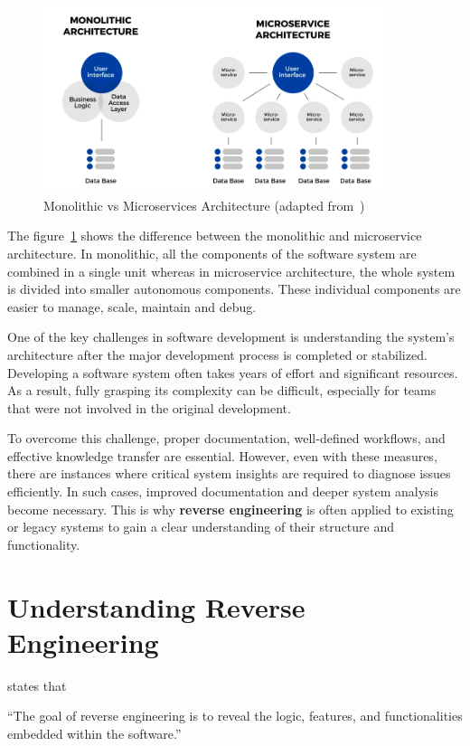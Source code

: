 \begin{figure}[H]
    \centering
    \includegraphics[width=0.9\textwidth]{figures/monolithic_microservices.png}
    \caption{Monolithic vs Microservices Architecture (adapted from~\cite{atlassian_microservices_vs_monolith})}
	\label{fig_background_monolithic_microservices}
\end{figure}

The figure~\ref{fig_background_monolithic_microservices} shows the difference between the monolithic and microservice architecture. In monolithic, all the components of the software system are combined in a single unit whereas in microservice architecture, the whole system is divided into smaller autonomous components. These individual components are easier to manage, scale, maintain and debug.

One of the key challenges in software development is understanding the system’s architecture after the major development process is completed or stabilized. Developing a software system often takes years of effort and significant resources. As a result, fully grasping its complexity can be difficult, especially for teams that were not involved in the original development.

To overcome this challenge, proper documentation, well-defined workflows, and effective knowledge transfer are essential. However, even with these measures, there are instances where critical system insights are required to diagnose issues efficiently. In such cases, improved documentation and deeper system analysis become necessary. This is why \textbf{reverse engineering} is often applied to existing or legacy systems to gain a clear understanding of their structure and functionality.

\section{Understanding Reverse Engineering}  
\citep{digitalai_reverse_engineering} states that 
\begin{tcolorbox}[colback=gray!10, colframe=gray!20]
	``The goal of reverse engineering is to reveal the logic, features, and functionalities embedded within the software.''
\end{tcolorbox}

